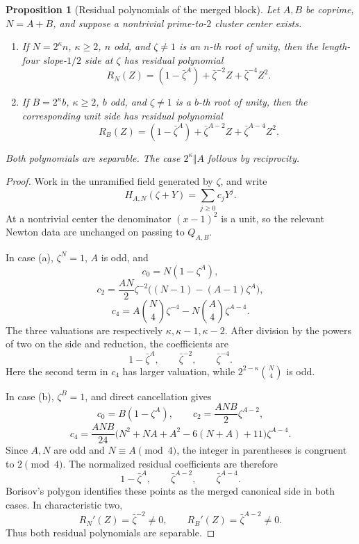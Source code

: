 \documentclass[11pt]{article}
\newtheorem{proposition}[theorem]{Proposition}
\theoremstyle{definition}
\begin{document}
\begin{proposition}[Residual polynomials of the merged block]
\label{prop:mergedtwo}
Let \(A,B\) be coprime, \(N=A+B\), and suppose a nontrivial
prime-to-\(2\) cluster center exists.
\begin{enumerate}[label=(\alph*)]
\item If \(N=2^\kappa n\), \(\kappa\geq2\), \(n\) odd, and
\(\zeta\neq1\) is an \(n\)-th root of unity, then the length-four
slope-\(1/2\) side at \(\zeta\) has residual polynomial
\[
 R_N(Z)=(1-\bar\zeta^A)+\bar\zeta^{-2}Z+
        \bar\zeta^{-4}Z^2.
\]
\item If \(B=2^\kappa b\), \(\kappa\geq2\), \(b\) odd, and
\(\zeta\neq1\) is a \(b\)-th root of unity, then the corresponding unit
side has residual polynomial
\[
 R_B(Z)=(1-\bar\zeta^A)+\bar\zeta^{A-2}Z+
        \bar\zeta^{A-4}Z^2.
\]
\end{enumerate}
Both polynomials are separable.  The case \(2^\kappa\Vert A\) follows by
reciprocity.
\end{proposition}

\begin{proof}
Work in the unramified field generated by \(\zeta\), and write
\[
 H_{A,N}(\zeta+Y)=\sum_{j\geq0}c_jY^j.
\]
At a nontrivial center the denominator \((x-1)^2\) is a unit, so the
relevant Newton data are unchanged on passing to \(Q_{A,B}\).

In case (a), \(\zeta^N=1\), \(A\) is odd, and
\[
 c_0=N(1-\zeta^A),
\]
\[
 c_2=\frac{AN}{2}\zeta^{-2}
       \bigl((N-1)-(A-1)\zeta^A\bigr),
\]
\[
 c_4=A\binom N4\zeta^{-4}
      -N\binom A4\zeta^{A-4}.
\]
The three valuations are respectively
\(\kappa,\kappa-1,\kappa-2\).  After division by the powers of two on the
side and reduction, the coefficients are
\[
 1-\bar\zeta^A,
 \qquad \bar\zeta^{-2},
 \qquad \bar\zeta^{-4}.
\]
Here the second term in \(c_4\) has larger valuation, while
\(2^{2-\kappa}\binom N4\) is odd.

In case (b), \(\zeta^B=1\), and direct cancellation gives
\[
 c_0=B(1-\zeta^A),
 \qquad
 c_2=\frac{ANB}{2}\zeta^{A-2},
\]
\[
 c_4=\frac{ANB}{24}
 \bigl(N^2+NA+A^2-6(N+A)+11\bigr)\zeta^{A-4}.
\]
Since \(A,N\) are odd and \(N\equiv A\pmod4\), the integer in parentheses
is congruent to \(2\pmod4\).  The normalized residual coefficients are
therefore
\[
 1-\bar\zeta^A,
 \qquad \bar\zeta^{A-2},
 \qquad \bar\zeta^{A-4}.
\]
Borisov's polygon identifies these points as the merged canonical side in
both cases.  In characteristic two,
\[
 R_N'(Z)=\bar\zeta^{-2}\neq0,
 \qquad
 R_B'(Z)=\bar\zeta^{A-2}\neq0.
\]
Thus both residual polynomials are separable.
\end{proof}
\end{document}
